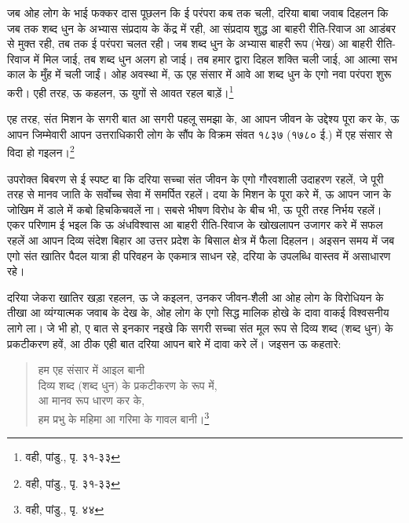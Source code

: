 जब ओह लोग के भाई फक्कर दास पूछलन कि ई परंपरा कब तक चली, दरिया बाबा जवाब दिहलन कि जब तक शब्द धुन के अभ्यास संप्रदाय के केंद्र में रही, आ संप्रदाय शुद्ध आ बाहरी रीति-रिवाज आ आडंबर से मुक्त रही, तब तक ई परंपरा चलत रही। जब शब्द धुन के अभ्यास बाहरी रूप (भेख) आ बाहरी रीति-रिवाज में मिल जाई, तब शब्द धुन अलग हो जाई। तब हमार द्वारा दिहल शक्ति चली जाई, आ आत्मा सभ काल के मुँह में चली जाईं। ओह अवस्था में, ऊ एह संसार में आवे आ शब्द धुन के एगो नवा परंपरा शुरू करी। एही तरह, ऊ कहलन, ऊ युगों से आवत रहल बाड़ें।\footnote{वही, पांडु., पृ. ३१-३३}

एह तरह, संत मिशन के सगरी बात आ सगरी पहलू समझा के, आ आपन जीवन के उद्देश्य पूरा कर के, ऊ आपन जिम्मेवारी आपन उत्तराधिकारी लोग के सौंप के विक्रम संवत १८३७ (१७८० ई.) में एह संसार से विदा हो गइलन।\footnote{वही, पांडु., पृ. ३१-३३}

उपरोक्त बिबरण से ई स्पष्ट बा कि दरिया सच्चा संत जीवन के एगो गौरवशाली उदाहरण रहलें, जे पूरी तरह से मानव जाति के सर्वोच्च सेवा में समर्पित रहलें। दया के मिशन के पूरा करे में, ऊ आपन जान के जोखिम में डाले में कबो हिचकिचवलें ना। सबसे भीषण विरोध के बीच भी, ऊ पूरी तरह निर्भय रहलें। एकर परिणाम ई भइल कि ऊ अंधविश्वास आ बाहरी रीति-रिवाज के खोखलापन उजागर करे में सफल रहलें आ आपन दिव्य संदेश बिहार आ उत्तर प्रदेश के बिसाल क्षेत्र में फैला दिहलन। अइसन समय में जब एगो संत खातिर पैदल यात्रा ही परिवहन के एकमात्र साधन रहे, दरिया के उपलब्धि वास्तव में असाधारण रहे।

दरिया जेकरा खातिर खड़ा रहलन, ऊ जे कइलन, उनकर जीवन-शैली आ ओह लोग के विरोधियन के तीखा आ व्यंग्यात्मक जवाब के देख के, ओह लोग के एगो सिद्ध मालिक होखे के दावा वाकई विश्वसनीय लागे ला। जे भी हो, ए बात से इनकार नइखे कि सगरी सच्चा संत मूल रूप से दिव्य शब्द (शब्द धुन) के प्रकटीकरण हवें, आ ठीक एही बात दरिया आपन बारे में दावा करे लें। जइसन ऊ कहतारे:

\begin{quote}
हम एह संसार में आइल बानी \\
दिव्य शब्द (शब्द धुन) के प्रकटीकरण के रूप में, \\
आ मानव रूप धारण कर के, \\
हम प्रभु के महिमा आ गरिमा के गावल बानी।\footnote{वही, पांडु., पृ. ४४}
\end{quote}

